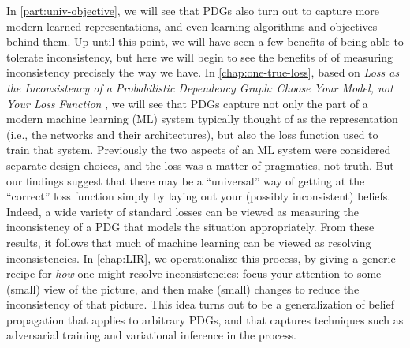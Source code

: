In \cref{part:univ-objective}, we will see that
PDGs also turn out to capture more modern learned representations, 
    and even learning algorithms and objectives behind them. 
Up until this point, we will have seen a few benefits of being able to tolerate inconsistency, but here we will begin to see the benefits of of measuring inconsistency precisely the way we have. 
In \cref{chap:one-true-loss}, 
based on
\textit{Loss as the Inconsistency of a Probabilistic Dependency Graph: Choose Your Model, not Your Loss Function} \citep{one-true-loss}, 
we will see that PDGs capture not only the part of a modern machine learning (ML) system typically thought of as the representation (i.e., the networks and their architectures), but also the loss function used to train that system.  
Previously the two aspects of an ML system were considered separate design choices, and the loss was a matter of pragmatics, not truth. 
But our findings suggest that 
there may be a ``universal'' way of getting at the ``correct'' loss function simply by laying out your (possibly inconsistent) beliefs. 
Indeed, a wide variety of standard losses can be viewed as measuring the inconsistency of a PDG that models the situation appropriately. 
%
From these results, it follows that much of machine learning can be viewed as resolving inconsistencies. 
%
In \cref{chap:LIR}, we operationalize this process, by giving a generic recipe for \emph{how} one might resolve inconsistencies:
focus your attention to some (small) view of the picture, and then make (small) changes to reduce the inconsistency of that picture. 
%
This idea turns out to be a generalization of {belief propagation} that applies to arbitrary PDGs, and that captures techniques such as adversarial training and variational inference in the process. 


